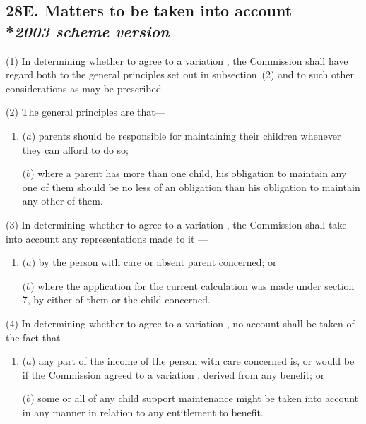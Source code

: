 \documentclass[12pt,a4paper]{article}
\begin{document}
\subsection[28E. Matters to be taken into account --- \emph{2003 scheme version}]{28E. Matters to be taken into account\\*\emph{2003 scheme version}}

(1) In determining 
whether to agree to a variation%
, the 
Commission  %
shall have regard both to the general principles set out in subsection~(2) and to such other considerations as may be prescribed.

(2) The general principles are that—
\begin{enumerate}\item[]
($a$) parents should be responsible for maintaining their children whenever they can afford to do so;

($b$) where a parent has more than one child, his obligation to maintain any one of them should be no less of an obligation than his obligation to maintain any other of them.
\end{enumerate}

(3) In determining 
whether to agree to a variation%
, the 
Commission  %
shall take into account any representations made to 
it%
—
\begin{enumerate}\item[]
($a$) by the person with care or absent parent concerned; or

($b$) where the application for the current 
calculation  %
was made under section 7, by either of them or the child concerned.
\end{enumerate}

(4) In determining 
whether to agree to a variation%
, no account shall be taken of the fact that—
\begin{enumerate}\item[]
($a$) any part of the income of the person with care concerned is, or would be if 
the 
Commission  %
agreed to a variation%
, derived from any benefit; or

($b$) some or all of any child support maintenance might be taken into account in any manner in relation to any entitlement to benefit.
\end{enumerate}
\end{document}
